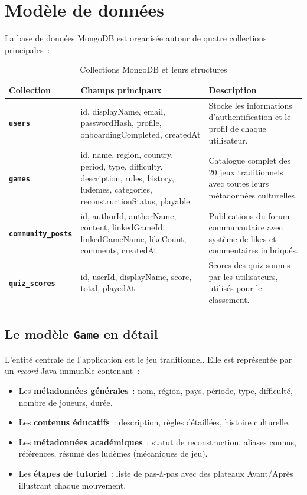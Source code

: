 \section{Modèle de données}

La base de données MongoDB est organisée autour de quatre collections principales~:

\begin{table}[H]
\centering
\renewcommand{\arraystretch}{1.4}
\begin{tabularx}{\textwidth}{>{\bfseries}p{3cm} p{4cm} X}
\toprule
\textbf{Collection} & \textbf{Champs principaux} & \textbf{Description} \\
\midrule
\texttt{users}
    & id, displayName, email, passwordHash, profile, onboardingCompleted, createdAt
    & Stocke les informations d'authentification et le profil de chaque utilisateur. \\
\midrule
\texttt{games}
    & id, name, region, country, period, type, difficulty, description, rules, history,
      ludemes, categories, reconstructionStatus, playable
    & Catalogue complet des 20 jeux traditionnels avec toutes leurs métadonnées culturelles. \\
\midrule
\texttt{community\_posts}
    & id, authorId, authorName, content, linkedGameId, linkedGameName, likeCount,
      comments, createdAt
    & Publications du forum communautaire avec système de likes et commentaires imbriqués. \\
\midrule
\texttt{quiz\_scores}
    & id, userId, displayName, score, total, playedAt
    & Scores des quiz soumis par les utilisateurs, utilisés pour le classement. \\
\bottomrule
\end{tabularx}
\caption{Collections MongoDB et leurs structures}
\label{tab:modele-donnees}
\end{table}

\subsection{Le modèle \texttt{Game} en détail}

L'entité centrale de l'application est le jeu traditionnel. Elle est représentée par un
\textit{record} Java immuable contenant~:

\begin{itemize}
    \item Les \textbf{métadonnées générales}~: nom, région, pays, période, type, difficulté,
          nombre de joueurs, durée.
    \item Les \textbf{contenus éducatifs}~: description, règles détaillées, histoire culturelle.
    \item Les \textbf{métadonnées académiques}~: statut de reconstruction, aliases connus,
          références, résumé des ludèmes (mécaniques de jeu).
    \item Les \textbf{étapes de tutoriel}~: liste de pas-à-pas avec des plateaux \og{}Avant/Après\fg{}
          illustrant chaque mouvement.
\end{itemize}

